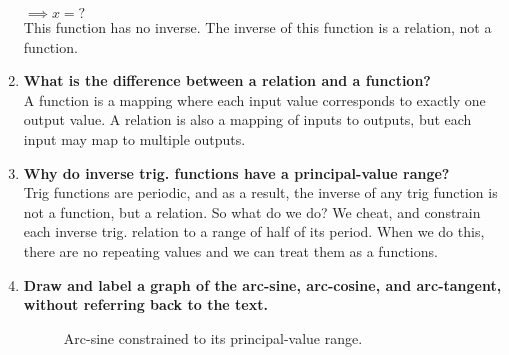 \begin{enumerate}
\tab \tab $\implies x = ?$\\

\tab \tab This function has no inverse.  The inverse of this function is a relation, not a function.\\

\item{{\bf What is the difference between a relation and a function?}\\
{A function is a mapping where each input value corresponds to exactly one output value.  A relation is also a mapping of inputs to outputs, but each input may map to multiple outputs.}\\}


\item{{\bf Why do inverse trig. functions have a principal-value range?}\\
{Trig functions are periodic, and as a result, the inverse of any trig function is not a function, but a relation.  So what do we do?  We cheat, and constrain each inverse trig. relation to a range of half of its period.  When we do this, there are no repeating values and we can treat them as a functions.}\\}

\item{\bf Draw and label a graph of the arc-sine, arc-cosine, and arc-tangent, without referring back to the text.}\\

\begin{figure}[htb!]
\center
\caption{Arc-sine constrained to its principal-value range.}
\label{fig:principal value arc sine}
\end{figure}
\end{enumerate}
